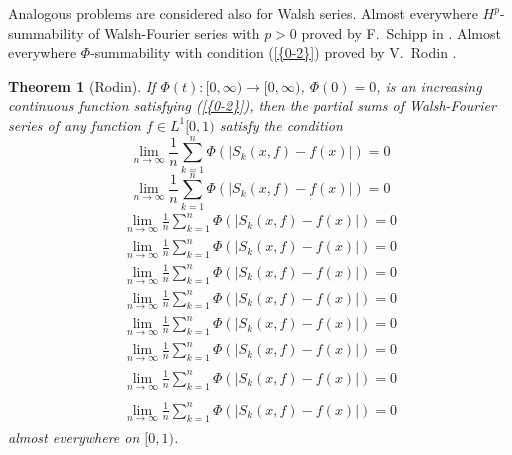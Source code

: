 \documentclass{amsart}
\newtheorem*{theorem}{Theorem}
\numberwithin{equation}{section}
\begin{document}
Analogous problems are considered also for Walsh series. Almost everywhere $H^p$-summability of Walsh-Fourier series with $p>0$ proved by F.~Schipp in \cite{Sch2}. Almost everywhere $\Phi$-summability with condition {(\ref{{0-2}})} proved by V.~Rodin \cite{Rod2}.
\begin{theorem}[Rodin]If $\Phi(t):[0,\infty)\to[0,\infty)$, $\Phi(0)=0$, is an increasing continuous function satisfying {(\ref{{0-2}})}, then  the partial sums of Walsh-Fourier series of any function $f\in L^1[0,1)$ satisfy the condition
 {
\begin{equation*} 
\lim_{n\to\infty}\frac{1}{n}\sum_{k=1}^n\Phi\left(|S_k(x,f)-f(x)|\right)=0
 \end{equation*}\fi  
{}\begin{equation}
\lim_{n\to\infty}\frac{1}{n}\sum_{k=1}^n\Phi\left(|S_k(x,f)-f(x)|\right)=0
\end{equation}\fi   
{}\begin{align*}
\lim_{n\to\infty}\frac{1}{n}\sum_{k=1}^n\Phi\left(|S_k(x,f)-f(x)|\right)=0
\end{align*}\fi   
{}\begin{align}
\lim_{n\to\infty}\frac{1}{n}\sum_{k=1}^n\Phi\left(|S_k(x,f)-f(x)|\right)=0
\end{align}\fi    
{}\begin{gather*}
\lim_{n\to\infty}\frac{1}{n}\sum_{k=1}^n\Phi\left(|S_k(x,f)-f(x)|\right)=0
\end{gather*}\fi  
{}\begin{gather}
\lim_{n\to\infty}\frac{1}{n}\sum_{k=1}^n\Phi\left(|S_k(x,f)-f(x)|\right)=0
\end{gather}\fi   
{}\begin{multline*}
\lim_{n\to\infty}\frac{1}{n}\sum_{k=1}^n\Phi\left(|S_k(x,f)-f(x)|\right)=0
\end{multline*}\fi  
{}\begin{multline}
\lim_{n\to\infty}\frac{1}{n}\sum_{k=1}^n\Phi\left(|S_k(x,f)-f(x)|\right)=0
\end{multline}\fi  
{}\begin{multline*}\begin{split}
\lim_{n\to\infty}\frac{1}{n}\sum_{k=1}^n\Phi\left(|S_k(x,f)-f(x)|\right)=0
\end{split}\end{multline*}\fi
{}\begin{multline}\begin{split}
\lim_{n\to\infty}\frac{1}{n}\sum_{k=1}^n\Phi\left(|S_k(x,f)-f(x)|\right)=0
\end{split}\end{multline}\fi
}
almost everywhere on $[0,1)$.
\end{theorem}
\end{document}
